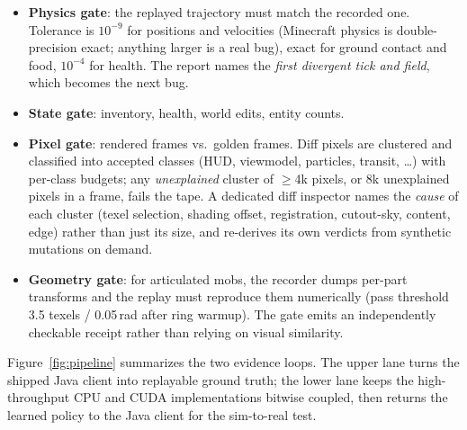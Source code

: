 \documentclass[11pt]{article}
\begin{document}
\begin{itemize}
\item \textbf{Physics gate}: the replayed trajectory must match the recorded one. Tolerance is $10^{-9}$ for positions and velocities (Minecraft physics is double-precision exact; anything larger is a real bug), exact for ground contact and food, $10^{-4}$ for health. The report names the \emph{first divergent tick and field}, which becomes the next bug.
\item \textbf{State gate}: inventory, health, world edits, entity counts.
\item \textbf{Pixel gate}: rendered frames vs.\ golden frames. Diff pixels are clustered and classified into accepted classes (HUD, viewmodel, particles, transit, \ldots) with per-class budgets; any \emph{unexplained} cluster of $\geq$4k pixels, or 8k unexplained pixels in a frame, fails the tape. A dedicated diff inspector names the \emph{cause} of each cluster (texel selection, shading offset, registration, cutout-sky, content, edge) rather than just its size, and re-derives its own verdicts from synthetic mutations on demand.
\item \textbf{Geometry gate}: for articulated mobs, the recorder dumps per-part transforms and the replay must reproduce them numerically (pass threshold 3.5 texels / 0.05\,rad after ring warmup). The gate emits an independently checkable receipt rather than relying on visual similarity.
\end{itemize}

Figure~\ref{fig:pipeline} summarizes the two evidence loops. The upper lane turns the shipped Java client into replayable ground truth; the lower lane keeps the high-throughput CPU and CUDA implementations bitwise coupled, then returns the learned policy to the Java client for the sim-to-real test.
\end{document}
